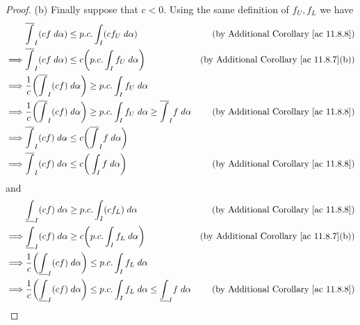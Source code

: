 \begin{proof}{(b)}
    Finally suppose that \(c < 0\).
    Using the same definition of \(f_U, f_L\) we have
    \begin{align*}
                 & \overline{\int}_I (cf \; d \alpha) \leq p.c. \int_I (c f_U \; d \alpha)                                                          & \text{(by Additional Corollary \ref{ac 11.8.8})}    \\
        \implies & \overline{\int}_I (cf \; d \alpha) \leq c \bigg(p.c. \int_I f_U \; d \alpha\bigg)                                                & \text{(by Additional Corollary \ref{ac 11.8.7}(b))} \\
        \implies & \frac{1}{c} \bigg(\overline{\int}_I (cf) \; d \alpha\bigg) \geq p.c. \int_I f_U \; d \alpha                                                                                            \\
        \implies & \frac{1}{c} \bigg(\overline{\int}_I (cf) \; d \alpha\bigg) \geq p.c. \int_I f_U \; d \alpha \geq \overline{\int}_I f \; d \alpha & \text{(by Additional Corollary \ref{ac 11.8.8})}    \\
        \implies & \overline{\int}_I (cf) \; d \alpha \leq c\bigg(\overline{\int}_I f \; d \alpha\bigg)                                                                                                   \\
        \implies & \overline{\int}_I (cf) \; d \alpha \leq c\bigg(\int_I f \; d \alpha\bigg)                                                        & \text{(by Additional Corollary \ref{ac 11.8.8})}
    \end{align*}
    and
    \begin{align*}
                 & \underline{\int}_I (cf) \; d \alpha \geq p.c. \int_I (c f_L) \; d \alpha                                                           & \text{(by Additional Corollary \ref{ac 11.8.8})}    \\
        \implies & \underline{\int}_I (cf) \; d \alpha \geq c \bigg(p.c. \int_I f_L \; d \alpha\bigg)                                                 & \text{(by Additional Corollary \ref{ac 11.8.7}(b))} \\
        \implies & \frac{1}{c} \bigg(\underline{\int}_I (cf) \; d \alpha\bigg) \leq p.c. \int_I f_L \; d \alpha                                                                                             \\
        \implies & \frac{1}{c} \bigg(\underline{\int}_I (cf) \; d \alpha\bigg) \leq p.c. \int_I f_L \; d \alpha \leq \underline{\int}_I f \; d \alpha & \text{(by Additional Corollary \ref{ac 11.8.8})}    \\

\end{align*}
\end{proof}
